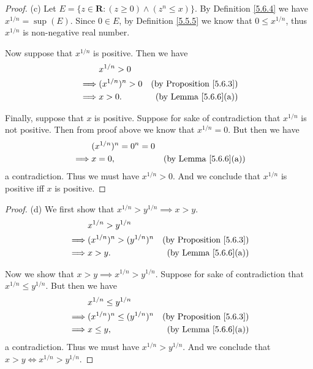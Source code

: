 \begin{proof}{(c)}
    Let \(E = \{z \in \mathbf{R} : (z \geq 0) \land (z^n \leq x)\}\).
    By Definition \ref{5.6.4} we have \(x^{1 / n} = \sup(E)\).
    Since \(0 \in E\), by Definition \ref{5.5.5} we know that \(0 \leq x^{1 / n}\), thus \(x^{1 / n}\) is non-negative real number.

    Now suppose that \(x^{1 / n}\) is positive.
    Then we have
    \begin{align*}
                 & x^{1 / n} > 0                                           \\
        \implies & (x^{1 / n})^n > 0 & \text{(by Proposition \ref{5.6.3})} \\
        \implies & x > 0.            & \text{(by Lemma \ref{5.6.6}(a))}    \\
    \end{align*}

    Finally, suppose that \(x\) is positive.
    Suppose for sake of contradiction that \(x^{1 / n}\) is not positive.
    Then from proof above we know that \(x^{1 / n} = 0\).
    But then we have
    \begin{align*}
                 & (x^{1 / n})^n = 0^n = 0                                    \\
        \implies & x = 0,                  & \text{(by Lemma \ref{5.6.6}(a))}
    \end{align*}
    a contradiction.
    Thus we must have \(x^{1 / n} > 0\).
    And we conclude that \(x^{1 / n}\) is positive iff \(x\) is positive.
\end{proof}

\begin{proof}{(d)}
    We first show that \(x^{1 / n} > y^{1 / n} \implies x > y\).
    \begin{align*}
                 & x^{1 / n} > y^{1 / n}                                               \\
        \implies & (x^{1 / n})^n > (y^{1 / n})^n & \text{(by Proposition \ref{5.6.3})} \\
        \implies & x > y.                        & \text{(by Lemma \ref{5.6.6}(a))}
    \end{align*}

    Now we show that \(x > y \implies x^{1 / n} > y^{1 / n}\).
    Suppose for sake of contradiction that \(x^{1 / n} \leq y^{1 / n}\).
    But then we have
    \begin{align*}
                 & x^{1 / n} \leq y^{1 / n}                                               \\
        \implies & (x^{1 / n})^n \leq (y^{1 / n})^n & \text{(by Proposition \ref{5.6.3})} \\
        \implies & x \leq y,                        & \text{(by Lemma \ref{5.6.6}(a))}
    \end{align*}
    a contradiction.
    Thus we must have \(x^{1 / n} > y^{1 / n}\).
    And we conclude that \(x > y \iff x^{1 / n} > y^{1 / n}\).
\end{proof}

